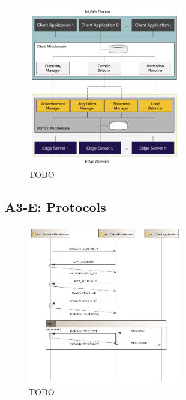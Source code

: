 \begin{figure}
  \includegraphics[width=0.6\textwidth]{figs/reference-architecture.png}
  \caption{TODO}
  \label{fig:reference-architecture}
\end{figure}



\subsection{A3-E: Protocols}

\begin{figure}
  \includegraphics[width=0.6\textwidth]{figs/protocols.png}
  \caption{TODO}
  \label{fig:protocols}
\end{figure}
